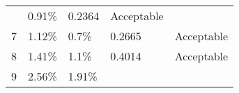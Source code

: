 \begin{longtable}[]{@{}lllll@{}}
\begin{minipage}[t]{0.26\columnwidth}
\end{minipage} & \begin{minipage}[t]{0.12\columnwidth}\raggedright
0.91\%\strut
\end{minipage} & \begin{minipage}[t]{0.19\columnwidth}\raggedright
0.2364\strut
\end{minipage} & \begin{minipage}[t]{0.18\columnwidth}\raggedright
Acceptable\strut
\end{minipage}\tabularnewline
\begin{minipage}[t]{0.12\columnwidth}\raggedright
7\strut
\end{minipage} & \begin{minipage}[t]{0.26\columnwidth}\raggedright
1.12\%\strut
\end{minipage} & \begin{minipage}[t]{0.12\columnwidth}\raggedright
0.7\%\strut
\end{minipage} & \begin{minipage}[t]{0.19\columnwidth}\raggedright
0.2665\strut
\end{minipage} & \begin{minipage}[t]{0.18\columnwidth}\raggedright
Acceptable\strut
\end{minipage}\tabularnewline
\begin{minipage}[t]{0.12\columnwidth}\raggedright
8\strut
\end{minipage} & \begin{minipage}[t]{0.26\columnwidth}\raggedright
1.41\%\strut
\end{minipage} & \begin{minipage}[t]{0.12\columnwidth}\raggedright
1.1\%\strut
\end{minipage} & \begin{minipage}[t]{0.19\columnwidth}\raggedright
0.4014\strut
\end{minipage} & \begin{minipage}[t]{0.18\columnwidth}\raggedright
Acceptable\strut
\end{minipage}\tabularnewline
\begin{minipage}[t]{0.12\columnwidth}\raggedright
9\strut
\end{minipage} & \begin{minipage}[t]{0.26\columnwidth}\raggedright
2.56\%\strut
\end{minipage} & \begin{minipage}[t]{0.12\columnwidth}\raggedright
1.91\%\strut
\end{minipage} & \begin{minipage}[t]{0.19\columnwidth}\raggedright

\end{minipage}
\end{longtable}
